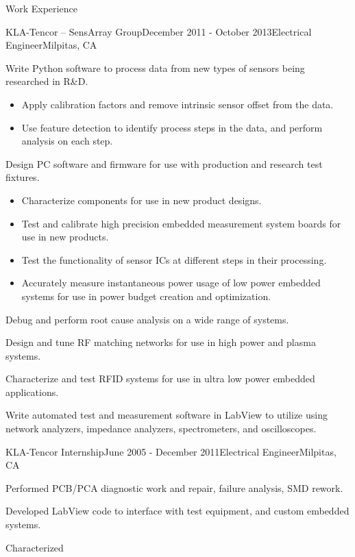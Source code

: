 \documentclass{resume} %
\begin{document}
\begin{rSection}{Work Experience}
\begin{rSubsection}{KLA-Tencor -- SensArray Group}{December 2011 - October 2013}{Electrical Engineer}{Milpitas, CA}
\item Write Python software to process data from new types of sensors being researched in R\&D.
\begin{itemize}
\itemsep -0.5em \vspace{-0.5em}
\renewcommand{\labelitemi}{-}
\item Apply calibration factors and remove intrinsic sensor offset from the data.
\item Use feature detection to identify process steps in the data, and perform analysis on each step.
\end{itemize}
\medskip

\item Design PC software and firmware for use with production and research test fixtures.
\begin{itemize}
\itemsep -0.5em \vspace{-0.5em}
\renewcommand{\labelitemi}{-}
\item Characterize components for use in new product designs.
\item Test and calibrate high precision embedded measurement system boards for use in new products.
\item Test the functionality of sensor ICs at different steps in their processing.
\item Accurately measure instantaneous power usage of low power embedded systems for use in power budget creation and optimization.
\end{itemize}
\medskip

\item Debug and perform root cause analysis on a wide range of systems.
\item Design and tune RF matching networks for use in high power and plasma systems.
\item Characterize and test RFID systems for use in ultra low power embedded applications.
\item Write automated test and measurement software in LabView to utilize using network analyzers, impedance analyzers, spectrometers, and oscilloscopes.

\end{rSubsection}


\begin{rSubsection}{KLA-Tencor Internship}{June 2005 - December 2011}{Electrical Engineer}{Milpitas, CA}
\item Performed PCB/PCA diagnostic work and repair, failure analysis, SMD rework.
\item Developed LabView code to interface with test equipment, and custom embedded systems.
\item Characterized 
\end{rSubsection}

\end{rSection}
\end{document}
